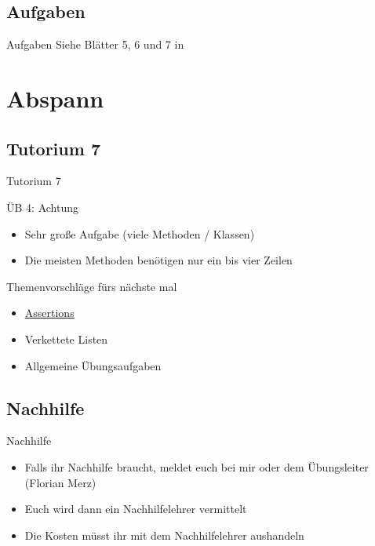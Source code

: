\documentclass[usepdftitle=false,hyperref={pdfpagelabels=false}]{beamer}
\begin{document}
\subsection{Aufgaben}
\begin{frame}{Aufgaben}
    Siehe Blätter 5, 6 und 7 in 
\end{frame}

\section{Abspann}
\subsection{Tutorium 7}
\begin{frame}{Tutorium 7}
    \begin{block}{ÜB 4: Achtung}
      \begin{itemize}
        \item Sehr große Aufgabe (viele Methoden / Klassen)
        \item Die meisten Methoden benötigen nur ein bis vier Zeilen
      \end{itemize}
    \end{block}

    \begin{block}{Themenvorschläge fürs nächste mal}
      \begin{itemize}
        \item \href{http://docs.oracle.com/javase/7/docs/technotes/guides/language/assert.html}{Assertions}
        \item Verkettete Listen
        \item Allgemeine Übungsaufgaben
      \end{itemize}
    \end{block}
\end{frame}

\subsection{Nachhilfe}
\begin{frame}{Nachhilfe}
    \begin{itemize}[<+->]
        \item Falls ihr Nachhilfe braucht, meldet euch bei mir oder
              dem Übungsleiter (Florian Merz)
        \item Euch wird dann ein Nachhilfelehrer vermittelt
        \item Die Kosten müsst ihr mit dem Nachhilfelehrer aushandeln
    \end{itemize}
\end{frame}
\end{document}
